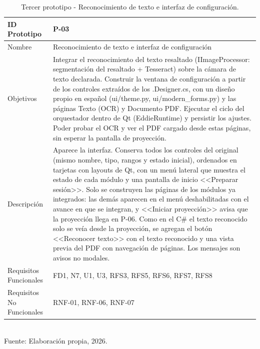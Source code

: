 \begin{table}[h!]
\centering
\caption{Tercer prototipo - Reconocimiento de texto e interfaz de configuración.}
\label{tab:prototipo-p03}
\begin{tabularx}{\textwidth}{|l|X|}
\hline
ID Prototipo & P-03 \\ \hline
Nombre & Reconocimiento de texto e interfaz de configuración \\ \hline
Objetivos & Integrar el reconocimiento del texto resaltado (IImageProcessor: segmentación del resaltado + Tesseract) sobre la cámara de texto declarada. \newline Construir la ventana de configuración a partir de los controles extraídos de los .Designer.cs, con un diseño propio en español (ui/theme.py, ui/modern\_forms.py) y las páginas Texto (OCR) y Documento PDF. \newline Ejecutar el ciclo del orquestador dentro de Qt (EddieRuntime) y persistir los ajustes. \newline Poder probar el OCR y ver el PDF cargado desde estas páginas, sin esperar la pantalla de proyección. \\ \hline
Descripción & Aparece la interfaz. Conserva todos los controles del original (mismo nombre, tipo, rangos y estado inicial), ordenados en tarjetas con layouts de Qt, con un menú lateral que muestra el estado de cada módulo y una pantalla de inicio <<Preparar sesión>>. Solo se construyen las páginas de los módulos ya integrados: las demás aparecen en el menú deshabilitadas con el avance en que se integran, y <<Iniciar proyección>> avisa que la proyección llega en P-06. Como en el C\# el texto reconocido solo se veía desde la proyección, se agregan el botón <<Reconocer texto>> con el texto reconocido y una vista previa del PDF con navegación de páginas. Los mensajes son avisos no modales. \\ \hline
Requisitos Funcionales & FD1, N7, U1, U3, RFS3, RFS5, RFS6, RFS7, RFS8 \\ \hline
Requisitos No Funcionales & RNF-01, RNF-06, RNF-07 \\ \hline
\end{tabularx}
\\[2pt] {\small Fuente: Elaboración propia, 2026.}
\end{table}

